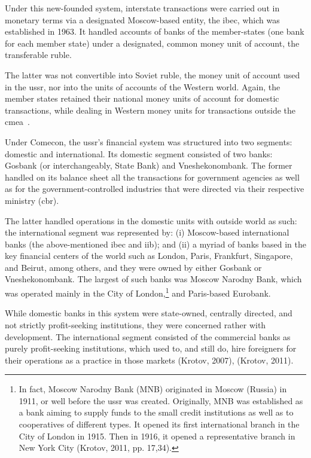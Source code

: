 Under this new-founded system, interstate transactions were carried out in monetary terms via a designated Moscow-based entity, the \ac{ibec}, which was established in 1963. It handled accounts of banks of the member-states (one bank for each member state) under a designated, common money unit of account, the transferable ruble. 

The latter was not convertible into Soviet ruble, the money unit of account used in the \ac{ussr}, nor into the units of accounts of the Western world. Again, the member states retained their national money units of account for domestic transactions, while dealing in Western money units for transactions outside the \ac{cmea}~\citep[see][]{vincze1984,kalinski2014}. 

Under Comecon, the \ac{ussr}'s financial system was structured into two segments: domestic and international. Its domestic segment consisted of two banks: Gosbank (or interchangeably, State Bank) and Vneshekonombank. The former handled on its balance sheet all the transactions for government agencies as well as for the government-controlled industries that were directed via their respective ministry (\ac{cbr}). 

The latter handled operations in the domestic units with outside world as such: the international segment was represented by: (i) Moscow-based international banks (the above-mentioned \ac{ibec} and \ac{iib}); and (ii) a myriad of banks based in the key financial centers of the world such as London, Paris, Frankfurt, Singapore, and Beirut, among others, and they were owned by either Gosbank or Vneshekonombank. The largest of such banks was Moscow Narodny Bank, which was operated mainly in the City of London,\footnote{In fact, Moscow Narodny Bank (MNB) originated in Moscow (Russia) in 1911, or well before the \ac{ussr} was created. Originally, MNB was established as a bank aiming to supply funds to the small credit institutions as well as to cooperatives of different types. It opened its first international branch in the City of London in 1915. Then in 1916, it opened a representative branch in New York City (Krotov, 2011, pp. 17,34).} and Paris-based Eurobank. 

While domestic banks in this system were state-owned, centrally directed, and not strictly profit-seeking institutions, they were concerned rather with development. The international segment consisted of the commercial banks as purely profit-seeking institutions, which used to, and still do, hire foreigners for their operations as a practice in those markets (Krotov, 2007), (Krotov, 2011). 

